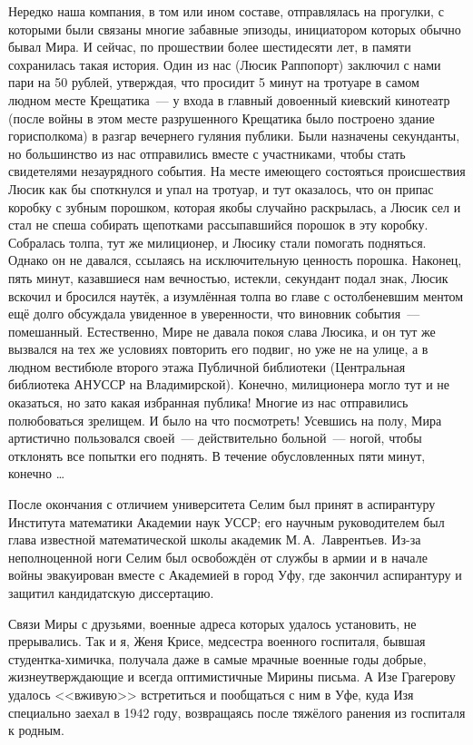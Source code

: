 Нередко наша компания, в том или ином составе, отправлялась на прогулки, с которыми были связаны многие забавные эпизоды,
инициатором которых обычно бывал Мира. И сейчас, по прошествии более шестидесяти лет, в памяти сохранилась такая история.
Один из нас (Люсик Раппопорт) заключил с нами пари на 50 рублей, утверждая,
что просидит 5 минут на тротуаре в самом людном месте Крещатика~---
у входа в главный довоенный киевский кинотеатр
(после войны в этом месте разрушенного Крещатика было построено здание горисполкома)
в разгар вечернего гуляния публики.
Были назначены секунданты, но большинство из нас отправились вместе с участниками,
чтобы стать свидетелями незаурядного события.
На месте имеющего состояться происшествия Люсик как бы споткнулся и упал на тротуар,
и тут оказалось, что он припас коробку с зубным порошком, которая якобы случайно раскрылась,
а Люсик сел и стал не спеша собирать щепотками рассыпавшийся порошок в эту коробку.
Собралась толпа, тут же милиционер, и Люсику стали помогать подняться.
Однако он не давался, ссылаясь на исключительную ценность порошка.
Наконец, пять минут, казавшиеся нам вечностью, истекли, секундант подал знак, Люсик вскочил и бросился наутёк,
а изумлённая толпа во главе с остолбеневшим ментом ещё долго обсуждала увиденное в уверенности,
что виновник события~--- помешанный.
Естественно, Мире не давала покоя слава Люсика, и он тут же вызвался на тех же условиях повторить его подвиг,
но уже не на улице, а в людном вестибюле второго этажа Публичной библиотеки
(Центральная библиотека АН\linebreak УССР на Владимирской).
Конечно, милиционера могло тут и не оказаться, но зато какая избранная публика!
Многие из нас отправились полюбоваться зрелищем. И было на что посмотреть!
Усевшись на полу, Мира артистично пользовался своей~--- действительно больной~--- ногой, чтобы отклонять все попытки его поднять. В течение обусловленных пяти минут, конечно \ldots

После окончания с отличием университета Селим был принят в аспирантуру Института математики Академии наук УССР; его научным руководителем был глава известной математической школы академик М.\,А.~Лаврентьев. Из-за неполноценной ноги Селим был освобождён от службы в армии и в начале войны эвакуирован вместе с Академией в город Уфу, где закончил аспирантуру и защитил
кандидатскую диссертацию.

Связи Миры с друзьями, военные адреса которых удалось установить, не прерывались. Так и я, Женя Крисе, медсестра военного госпиталя, бывшая студентка-химичка, получала даже в самые мрачные военные годы добрые, жизнеутверждающие и всегда оптимистичные Мирины письма. А Изе Грагерову удалось <<вживую>> встретиться и пообщаться с ним в Уфе, куда Изя специально заехал в 1942 году, возвращаясь после тяжёлого ранения из госпиталя к родным.

